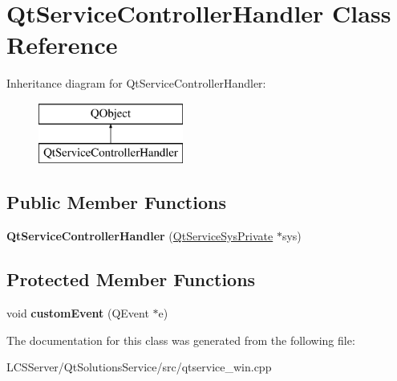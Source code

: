 \hypertarget{class_qt_service_controller_handler}{}\section{Qt\+Service\+Controller\+Handler Class Reference}
\label{class_qt_service_controller_handler}
Inheritance diagram for Qt\+Service\+Controller\+Handler\+:\begin{figure}[H]
\begin{center}
\leavevmode
\includegraphics[height=2.000000cm]{class_qt_service_controller_handler}
\end{center}
\end{figure}
\subsection*{Public Member Functions}
\begin{DoxyCompactItemize}
\item 
\mbox{\label{class_qt_service_controller_handler_aececaafe4c1381e632ff5da78187d136}} 
{\bfseries Qt\+Service\+Controller\+Handler} (\hyperlink{class_qt_service_sys_private}{Qt\+Service\+Sys\+Private} $\ast$sys)
\end{DoxyCompactItemize}
\subsection*{Protected Member Functions}
\begin{DoxyCompactItemize}
\item 
\mbox{\label{class_qt_service_controller_handler_a92e2fafac640400c4defe718024f5340}} 
void {\bfseries custom\+Event} (Q\+Event $\ast$e)
\end{DoxyCompactItemize}


The documentation for this class was generated from the following file\+:\begin{DoxyCompactItemize}
\item 
L\+C\+S\+Server/\+Qt\+Solutions\+Service/src/qtservice\+\_\+win.\+cpp\end{DoxyCompactItemize}
